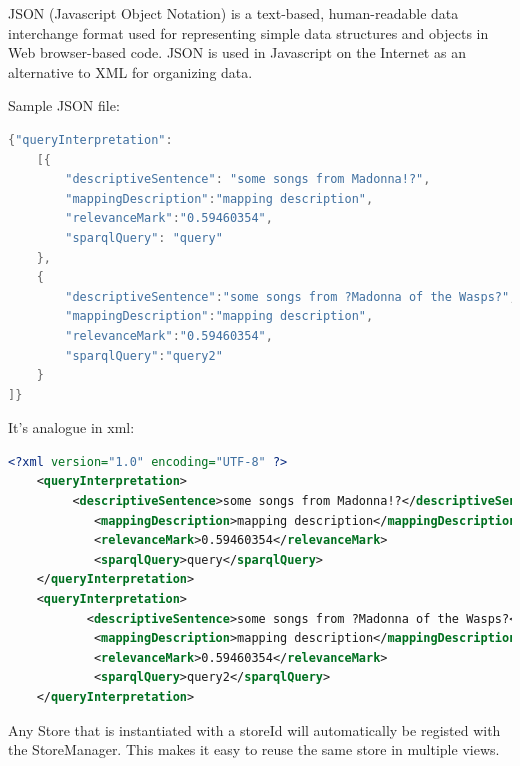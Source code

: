 \par JSON (Javascript Object Notation) is a text-based, human-readable data interchange format used for representing simple data structures and objects in Web browser-based code. JSON is used in Javascript on the Internet as an alternative to XML for organizing data.\\
\par Sample JSON file: \\
\begin{lstlisting}[language=Java]
{"queryInterpretation":
	[{
		"descriptiveSentence": "some songs from Madonna!?",
		"mappingDescription":"mapping description",
		"relevanceMark":"0.59460354",
		"sparqlQuery": "query"
    },
	{
		"descriptiveSentence":"some songs from ?Madonna of the Wasps?",
		"mappingDescription":"mapping description",
		"relevanceMark":"0.59460354",
		"sparqlQuery":"query2"
	}
]}
\end{lstlisting}

\par It’s analogue in xml: \\

\begin{lstlisting}[language=XML]
<?xml version="1.0" encoding="UTF-8" ?>
    <queryInterpretation>
         <descriptiveSentence>some songs from Madonna!?</descriptiveSentence>
            <mappingDescription>mapping description</mappingDescription>
            <relevanceMark>0.59460354</relevanceMark>
            <sparqlQuery>query</sparqlQuery>
    </queryInterpretation>
    <queryInterpretation>
           <descriptiveSentence>some songs from ?Madonna of the Wasps?</descriptiveSentence>
            <mappingDescription>mapping description</mappingDescription>
            <relevanceMark>0.59460354</relevanceMark>
            <sparqlQuery>query2</sparqlQuery>
    </queryInterpretation>   
\end{lstlisting}
Any Store that is instantiated with a storeId will automatically be registed with the StoreManager. This makes it easy to reuse the same store in multiple views.


